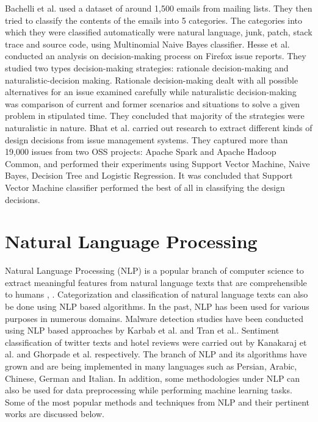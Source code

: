 \documentclass[a4paper,12pt,twoside]{report}
\begin{document}
\newline \newline
Bachelli et al.\cite{Bacchelli2012} used a dataset of around 1,500 emails from mailing lists. They then tried to classify the contents of the emails into 5 categories. The categories into which they were classified automatically were natural language, junk, patch, stack trace and source code, using Multinomial Naive Bayes classifier. 
\newline \newline
Hesse et al.\cite{Hesse2016} conducted an analysis on decision-making process on Firefox issue reports. They studied two types decision-making strategies: rationale decision-making and naturalistic-decision making. Rationale decision-making dealt with all possible alternatives for an issue examined carefully while naturalistic decision-making was comparison of current and former scenarios and situations to solve a given problem in stipulated time. They concluded that majority of the strategies were naturalistic in nature. 
\newline \newline
Bhat et al.\cite{Bhat2017} carried out research to extract different kinds of design decisions from issue management systems. They captured more than 19,000 issues from two \acs{OSS} projects: Apache Spark and Apache Hadoop Common, and performed their experiments using Support Vector Machine, Naive Bayes, Decision Tree and Logistic Regression. It was concluded that Support Vector Machine classifier performed the best of all in classifying the design decisions. 


\section{Natural Language Processing}

Natural Language Processing (\acs{NLP}) is a popular branch of computer science to extract meaningful features from natural language texts that are comprehensible to humans \cite{Al-ghamdi2017}, \cite{Suhaimin2017}. Categorization and classification of natural language texts can also be done using \acs{NLP} based algorithms. In the past, \acs{NLP} has been used for various purposes in numerous domains. Malware detection studies have been conducted using \acs{NLP} based approaches by Karbab et al. \cite{Karbab2017} and Tran et al.\cite{Tran2017}. Sentiment classification of twitter texts and hotel reviews were carried out by Kanakaraj et al.\cite{Kanakaraj2015} and Ghorpade et al.\cite{Ghorpade2012} respectively. The branch of \acs{NLP} and its algorithms have grown and are being implemented in many languages such as Persian\cite{Ri}, Arabic\cite{Abuleil2007}, Chinese\cite{Liu2008}, German\cite{Metzmacher2017} and Italian\cite{Damiano2017}. 
\newline \newline
In addition, some methodologies under \acs{NLP} can also be used for data preprocessing while performing machine learning tasks. Some of the most popular methods and techniques from \acs{NLP} and their pertinent works are discussed below. 
\end{document}
